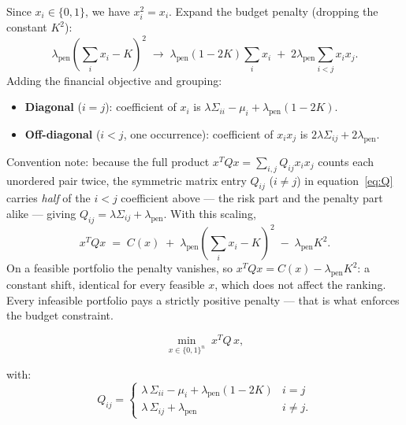 \documentclass[a4paper,11pt]{article}
\begin{document}
\begin{warningbox}
Since $x_i \in \{0,1\}$, we have $x_i^2 = x_i$.
Expand the budget penalty (dropping the constant $K^2$):
\[
    \lambda_\text{pen}\!\left(\sum_i x_i - K\right)^{\!2}
    \;\longrightarrow\;
    \lambda_\text{pen}(1-2K)\!\sum_i x_i
    \;+\; 2\lambda_\text{pen}\!\sum_{i<j} x_i x_j.
\]
Adding the financial objective and grouping:
\begin{itemize}
  \item \textbf{Diagonal} ($i=j$): coefficient of $x_i$ is
        $\lambda\Sigma_{ii} - \mu_i + \lambda_\text{pen}(1-2K)$.
  \item \textbf{Off-diagonal} ($i<j$, one occurrence): coefficient of $x_ix_j$ is
        $2\lambda\Sigma_{ij} + 2\lambda_\text{pen}$.
\end{itemize}
Convention note: because the full product $x^TQx = \sum_{i,j}Q_{ij}x_ix_j$ counts
each unordered pair twice, the symmetric matrix entry $Q_{ij}$ ($i\neq j$) in
equation~\eqref{eq:Q} carries \emph{half} of the $i<j$ coefficient above — the
risk part and the penalty part alike — giving
$Q_{ij}=\lambda\Sigma_{ij}+\lambda_\text{pen}$.
With this scaling,
\[
    x^TQx \;=\; C(x) \;+\; \lambda_\text{pen}\!\left(\sum_i x_i - K\right)^{\!2}
    \;-\; \lambda_\text{pen}K^2 .
\]
On a feasible portfolio the penalty vanishes, so $x^TQx = C(x) - \lambda_\text{pen}K^2$:
a constant shift, identical for every feasible $x$, which does not affect the ranking.
Every infeasible portfolio pays a strictly positive penalty — that is what enforces
the budget constraint.
\end{warningbox}

\begin{equation}
    \min_{x\in\{0,1\}^n}\; x^T Q\, x,
    \label{eq:qubo}
\end{equation}

\noindent with:
\begin{equation}
    Q_{ij} = \begin{cases}
        \lambda\,\Sigma_{ii} - \mu_i + \lambda_\text{pen}(1-2K)
        & i = j \\[4pt]
        \lambda\,\Sigma_{ij} + \lambda_\text{pen}
        & i \neq j.
    \end{cases}
    \label{eq:Q}
\end{equation}
\end{document}
